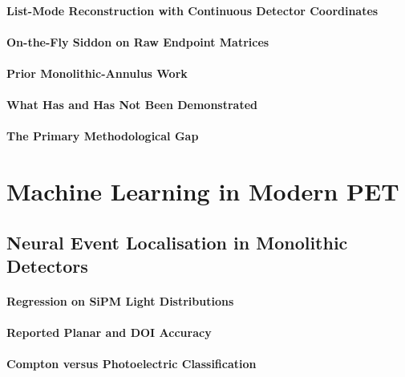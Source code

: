 \paragraph{List-Mode Reconstruction with Continuous Detector Coordinates}

\paragraph{On-the-Fly Siddon on Raw Endpoint Matrices}

\paragraph{Prior Monolithic-Annulus Work}

\paragraph{What Has and Has Not Been Demonstrated}

\paragraph{The Primary Methodological Gap}

\section{Machine Learning in Modern PET}

\subsection{Neural Event Localisation in Monolithic Detectors}

\paragraph{Regression on SiPM Light Distributions}

\paragraph{Reported Planar and DOI Accuracy}

\paragraph{Compton versus Photoelectric Classification}

